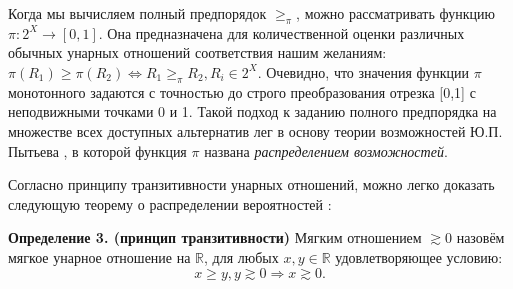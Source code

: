 \documentclass[12pt, a4paper, oneside]{article}
\begin{document}
				\begin{center}
				
				
				\end{center}
			
				Когда мы вычисляем полный предпорядок $\ge_\pi$, можно рассматривать функцию $\pi: 2^X\to [0,1]$. Она предназначена для количественной оценки различных обычных унарных отношений соответствия нашим желаниям: $\pi(R_1)\ge\pi(R_2)\Leftrightarrow R_1\ge_\pi R_2, R_i\in 2^X$. Очевидно, что значения функции $\pi$ монотонного задаются с точностью до строго преобразования отрезка [0,1] с неподвижными точками 0 и 1. Такой подход к заданию полного предпорядка на множестве всех доступных альтернатив лег в основу теории возможностей Ю.П. Пытьева \cite{2}, в которой функция $\pi$ названа \textit{распределением возможностей}.
				
				
				
				Согласно принципу транзитивности унарных отношений, можно легко доказать следующую теорему о распределении вероятностей \cite{2}:
				
				\textbf{Определение 3. (принцип транзитивности)} Мягким отношением $\gtrsim 0$ назовём мягкое унарное отношение на $\mathbb{R}$, для любых $x,y\in\mathbb{R}$ удовлетворяющее условию:
				\[x\ge y,y\gtrsim 0\Rightarrow x\gtrsim 0.\]
				
\end{document}
